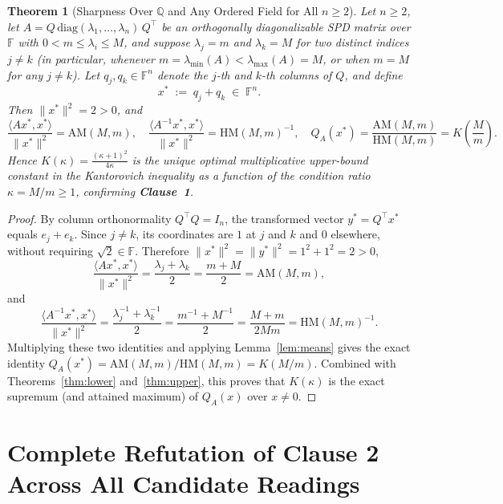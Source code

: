 \documentclass[11pt,a4paper]{article}
\newtheorem{theorem}{Theorem}[section]
\theoremstyle{definition}
\newcommand{\AM}{\mathrm{AM}}
\newcommand{\HM}{\mathrm{HM}}
\newcommand{\diag}{\mathrm{diag}}
\begin{document}
\begin{theorem}[Sharpness Over $\mathbb{Q}$ and Any Ordered Field for All $n \ge 2$]
\label{thm:sharp}
Let $n \ge 2$, let $A = Q\,\diag(\lambda_1,\dots,\lambda_n)\,Q^\top$ be an
orthogonally diagonalizable SPD matrix over $\mathbb{F}$ with
$0 < m \le \lambda_i \le M$, and suppose $\lambda_j = m$ and $\lambda_k = M$ for
two distinct indices $j \ne k$ (in particular, whenever $m = \lambda_{\min}(A) <
\lambda_{\max}(A) = M$, or when $m = M$ for any $j \ne k$). Let $q_j, q_k \in
\mathbb{F}^n$ denote the $j$-th and $k$-th columns of $Q$, and define
\[
  x^* \;:=\; q_j + q_k \;\in\; \mathbb{F}^n.
\]
Then $\|x^*\|^2 = 2 > 0$, and
\begin{equation}
  \label{eq:extremizer}
  \frac{\langle Ax^*, x^*\rangle}{\|x^*\|^2} = \AM(M,m), \quad
  \frac{\langle A^{-1}x^*, x^*\rangle}{\|x^*\|^2} = \HM(M,m)^{-1}, \quad
  Q_A(x^*) = \frac{\AM(M,m)}{\HM(M,m)} = K\!\left(\frac{M}{m}\right).
\end{equation}
Hence $K(\kappa) = \frac{(\kappa + 1)^2}{4\kappa}$ is the unique optimal
multiplicative upper-bound constant in the Kantorovich inequality as a function
of the condition ratio $\kappa = M/m \ge 1$, confirming \textbf{Clause~1}.
\end{theorem}
\begin{proof}
By column orthonormality $Q^\top Q = I_n$, the transformed vector $y^* = Q^\top x^*$
equals $e_j + e_k$. Since $j \ne k$, its coordinates are $1$ at $j$ and $k$ and
$0$ elsewhere, without requiring $\sqrt{2} \in \mathbb{F}$. Therefore
$\|x^*\|^2 = \|y^*\|^2 = 1^2 + 1^2 = 2 > 0$,
\[
  \frac{\langle Ax^*, x^*\rangle}{\|x^*\|^2}
  = \frac{\lambda_j + \lambda_k}{2}
  = \frac{m + M}{2}
  = \AM(M,m),
\]
and
\[
  \frac{\langle A^{-1}x^*, x^*\rangle}{\|x^*\|^2}
  = \frac{\lambda_j^{-1} + \lambda_k^{-1}}{2}
  = \frac{m^{-1} + M^{-1}}{2}
  = \frac{M + m}{2Mm}
  = \HM(M,m)^{-1}.
\]
Multiplying these two identities and applying Lemma~\ref{lem:means} gives the
exact identity $Q_A(x^*) = \AM(M,m)/\HM(M,m) = K(M/m)$. Combined with
Theorems~\ref{thm:lower} and~\ref{thm:upper}, this proves that $K(\kappa)$ is
the exact supremum (and attained maximum) of $Q_A(x)$ over $x \ne 0$.
\end{proof}

\section{Complete Refutation of Clause 2 Across All Candidate Readings}
\label{sec:clause2}
\end{document}
